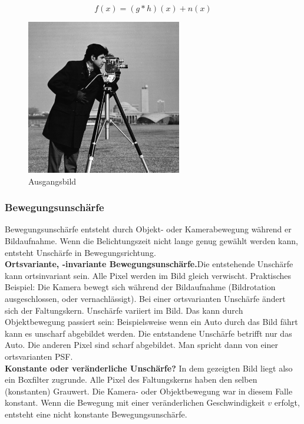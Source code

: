 \documentclass[a4paper,12pt]{article}
\begin{document}
\begin{equation} \label{eq:faltung2}
f(x)=(g*h)(x)+n(x)
\end{equation}


\begin{figure}[htbp]
\centering
\includegraphics[scale=0.8]{camera.png}
\caption{Ausgangsbild}
\label{figure_camera}
\end{figure}


\subsubsection{Bewegungsunschärfe} \label{chp:einf_unschaerfe}
Bewegungsunschärfe entsteht durch Objekt- oder Kamerabewegung während er
Bildaufnahme. Wenn die Belichtungszeit nicht lange genug gewählt werden kann,
 entsteht Unschärfe in Bewegungsrichtung. \\
 \textbf{Ortsvariante, -invariante Bewegungsunschärfe.}Die entstehende Unschärfe
 kann ortsinvariant sein. Alle Pixel werden im Bild gleich verwischt.
 Praktisches Beispiel: Die Kamera bewegt sich während der Bildaufnahme
 (Bildrotation ausgeschlossen, oder vernachlässigt). Bei einer ortsvarianten Unschärfe 
 ändert sich der Faltungskern. Unschärfe variiert im Bild. Das kann
 durch Objektbewegung passiert sein: Beispielsweise wenn ein Auto durch das Bild
 fährt kann es unscharf abgebildet werden. Die entstandene Unschärfe betrifft
 nur das Auto. Die anderen Pixel sind scharf abgebildet. Man spricht dann von einer
 ortsvarianten PSF.\\
\textbf{Konstante oder veränderliche Unschärfe?} In dem gezeigten Bild liegt
also ein Boxfilter zugrunde. Alle Pixel des Faltungskerns haben den selben (konstanten)
Grauwert. Die Kamera- oder Objektbewegung war in diesem Falle konstant. Wenn die Bewegung mit
einer veränderlichen Geschwindigkeit $v$ erfolgt, entsteht eine nicht konstante
Bewegungsunschärfe.
\end{document}
